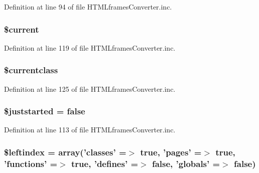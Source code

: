 \-Definition at line 94 of file \-H\-T\-M\-Lframes\-Converter.\-inc.

\hypertarget{class_h_t_m_lframes_converter_a2c4c58e377f6c66ca38c8ea97666fc5e}{
\subsubsection[{\$current}]{\setlength{\rightskip}{0pt plus 5cm}\$current}}\label{class_h_t_m_lframes_converter_a2c4c58e377f6c66ca38c8ea97666fc5e}


\-Definition at line 119 of file \-H\-T\-M\-Lframes\-Converter.\-inc.

\hypertarget{class_h_t_m_lframes_converter_a14f3ccc5fc24cdb94ee022a77ef69c4d}{
\subsubsection[{\$currentclass}]{\setlength{\rightskip}{0pt plus 5cm}\$currentclass}}\label{class_h_t_m_lframes_converter_a14f3ccc5fc24cdb94ee022a77ef69c4d}


\-Definition at line 125 of file \-H\-T\-M\-Lframes\-Converter.\-inc.

\hypertarget{class_h_t_m_lframes_converter_acb00e2d25525278b0592bfffe53bc4b6}{
\subsubsection[{\$juststarted}]{\setlength{\rightskip}{0pt plus 5cm}\$juststarted = false}}\label{class_h_t_m_lframes_converter_acb00e2d25525278b0592bfffe53bc4b6}


\-Definition at line 113 of file \-H\-T\-M\-Lframes\-Converter.\-inc.

\hypertarget{class_h_t_m_lframes_converter_ab49669c749559bb7833762878adb8f0c}{
\subsubsection[{\$leftindex}]{\setlength{\rightskip}{0pt plus 5cm}\$leftindex = array('classes' =$>$ true, 'pages' =$>$ true, 'functions' =$>$ true, 'defines' =$>$ false, 'globals' =$>$ false)}}\label{class_h_t_m_lframes_converter_ab49669c749559bb7833762878adb8f0c}


